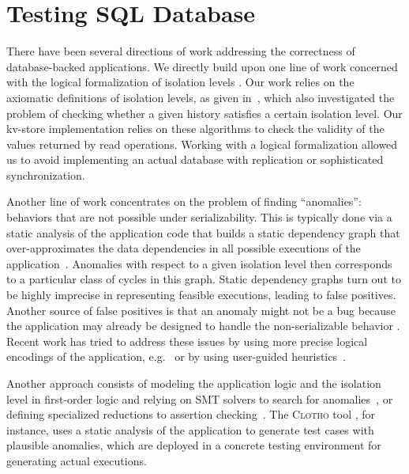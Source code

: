 
\section{Testing SQL Database}
\label{sec:related}


There have been several directions of work addressing the correctness of database-backed applications. 
We directly build upon one line of work concerned with the logical formalization
of isolation levels 
\cite{ansi,DBLP:conf/icde/AdyaLO00,DBLP:conf/sigmod/BerensonBGMOO95,DBLP:conf/concur/Cerone0G15,DBLP:journals/pacmpl/BiswasE19}.
Our work relies on the axiomatic definitions of isolation levels, as given
in~\cite{DBLP:journals/pacmpl/BiswasE19}, which also investigated
the problem of checking whether a given history satisfies a certain isolation
level. Our kv-store implementation relies on these algorithms 
to check the validity of the values returned by read operations. Working with a
logical formalization allowed us to avoid implementing an actual database with replication or
sophisticated synchronization.

Another line of work concentrates on the problem of finding ``anomalies'': 
behaviors that are not possible under serializability. This is typically done
via a static analysis of the application code that builds a static dependency graph that
over-approximates the data dependencies in all possible
executions of the application~\cite{DBLP:journals/jacm/CeroneG18,DBLP:journals/jacm/CeroneG18,DBLP:conf/concur/0002G16,DBLP:journals/tods/FeketeLOOS05,DBLP:conf/vldb/JorwekarFRS07,acidrain,isodiff}.
Anomalies with respect to a given isolation level then corresponds to a
particular class of cycles in this graph. Static dependency graphs turn out to
be highly imprecise in representing feasible executions, leading to false
positives. Another source of false positives is that an anomaly might not be a
bug because the application may already be designed to handle the
non-serializable behavior \cite{DBLP:conf/pldi/BrutschyD0V18,isodiff}. 
Recent work has tried to address these issues by using more precise 
logical encodings of the application,
e.g.~\cite{DBLP:conf/popl/BrutschyD0V17,DBLP:conf/pldi/BrutschyD0V18} or
by using user-guided heuristics~\cite{isodiff}. 

Another approach consists of modeling the application
logic and the isolation level in first-order logic and relying on SMT solvers to
search for anomalies~\cite{DBLP:journals/pacmpl/KakiESJ18,DBLP:conf/concur/NagarJ18,burcu-netys},
or defining specialized reductions to assertion
checking~\cite{DBLP:conf/concur/BeillahiBE19,DBLP:conf/cav/BeillahiBE19}.
The \textsc{Clotho} tool \cite{clotho}, for instance, uses a static analysis of the application to
generate test cases with plausible anomalies, which are deployed in a concrete
testing environment for generating actual executions. 

